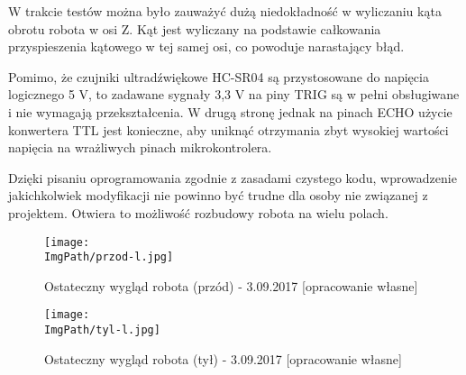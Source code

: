 \documentclass[a4paper,12pt,twoside,openany]{report}
\newcommand{\ImgPath}{.}
\begin{document}
W trakcie testów można było zauważyć dużą niedokładność w wyliczaniu kąta obrotu robota w osi Z. Kąt jest wyliczany na podstawie całkowania przyspieszenia kątowego w tej samej osi, co powoduje narastający błąd. 

Pomimo, że czujniki ultradźwiękowe HC-SR04 są przystosowane do napięcia logicznego 5 V, to zadawane sygnały 3,3 V na piny TRIG są w pełni obsługiwane i nie wymagają przekształcenia. W drugą stronę jednak na pinach ECHO użycie konwertera TTL jest konieczne, aby uniknąć otrzymania zbyt wysokiej wartości napięcia na wrażliwych pinach mikrokontrolera.

Dzięki pisaniu oprogramowania zgodnie z zasadami czystego kodu, wprowadzenie jakichkolwiek modyfikacji nie powinno być trudne dla osoby nie związanej z projektem. Otwiera to możliwość rozbudowy robota na wielu polach. 

\begin{figure}[!htbp]
	\begin{center}
\centering
\texttt{[image: \\ImgPath/przod-l.jpg]}
\end{center}
	\caption{Ostateczny wygląd robota (przód) - 3.09.2017 [opracowanie własne]}
	\label{schematKomunikacji}
\end{figure}

\begin{figure}[!htbp]
	\begin{center}
\centering
\texttt{[image: \\ImgPath/tyl-l.jpg]}
\end{center}
	\caption{Ostateczny wygląd robota (tył) - 3.09.2017 [opracowanie własne]}
	\label{schematKomunikacji}
\end{figure}
\end{document}
